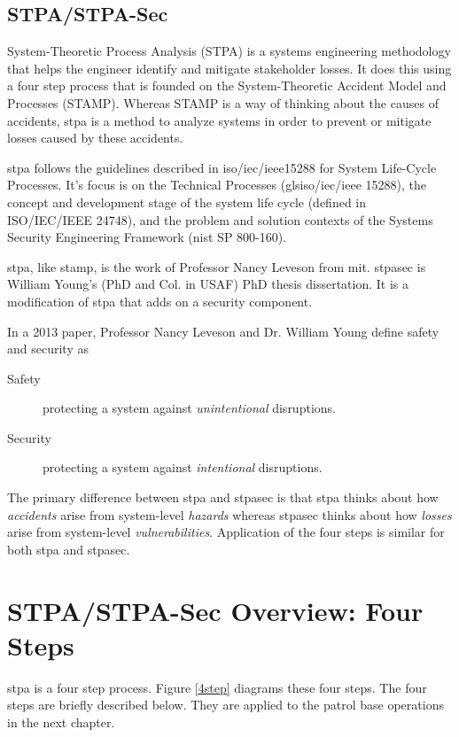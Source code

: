 \documentclass[../../main/main.tex]{subfiles}
\begin{document}
\subsection{STPA/STPA-Sec}\label{ssec:stpa}
System-Theoretic Process Analysis (STPA) is a systems engineering methodology that helps the engineer identify and mitigate stakeholder losses. It does this using a four step process that is founded on the System-Theoretic Accident Model and Processes (STAMP).  Whereas STAMP is a way of thinking about the causes of accidents, \gls{stpa} is a method to analyze systems in order to prevent or mitigate losses caused by these accidents.  

\gls{stpa} follows the guidelines described in \gls{iso}/\gls{iec}/\gls{ieee}15288 for System Life-Cycle Processes.  It's focus is on the Technical Processes (gls{iso}/\gls{iec}/\gls{ieee} 15288), the concept and development stage of the system life cycle (defined in ISO/IEC/IEEE 24748), and the problem and solution contexts of the Systems Security Engineering Framework (\gls{nist} SP 800-160).

\gls{stpa}, like \gls{stamp}, is the work of Professor Nancy Leveson from \gls{mit}.  \gls{stpasec} is William Young's (PhD and Col. in USAF) PhD thesis dissertation.  It is a modification of \gls{stpa} that adds on a security component.  

In a 2013 paper, Professor Nancy Leveson and Dr. William Young define safety and security as
\begin{description}
\item[ Safety ] protecting a system against \textit{unintentional} disruptions.
\item[ Security ] protecting a system against \textit{intentional} disruptions.
\end{description}
The primary difference between \gls{stpa} and \gls{stpasec} is that \gls{stpa} thinks about how \textit{accidents} arise from system-level \textit{hazards} whereas \gls{stpasec} thinks about how \textit{losses} arise from system-level \textit{vulnerabilities}.  Application of the four steps is similar for both \gls{stpa} and \gls{stpasec}.


\section{STPA/STPA-Sec Overview: Four Steps}
\gls{stpa} is a four step process.  Figure \ref{4step} diagrams these four steps.  The four steps are briefly described below.  They are applied to the patrol base operations in the next chapter. 
\end{document}
